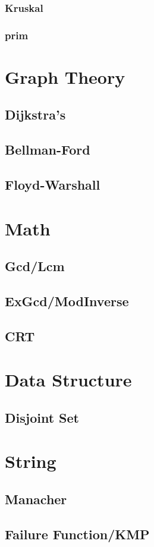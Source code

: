         \subsubsection{Kruskal}
            
        \subsubsection{prim}
            
\section{Graph Theory}
	\subsection{Dijkstra’s}
		
	\subsection{Bellman-Ford}
		
	\subsection{Floyd-Warshall}
		
\section{Math}
	\subsection{Gcd/Lcm}
		
	\subsection{ExGcd/ModInverse}
		
	\subsection{CRT}
		
\section{Data Structure}
	\subsection{Disjoint Set}
		
\section{String}
	\subsection{Manacher}
		
	\subsection{Failure Function/KMP}
		